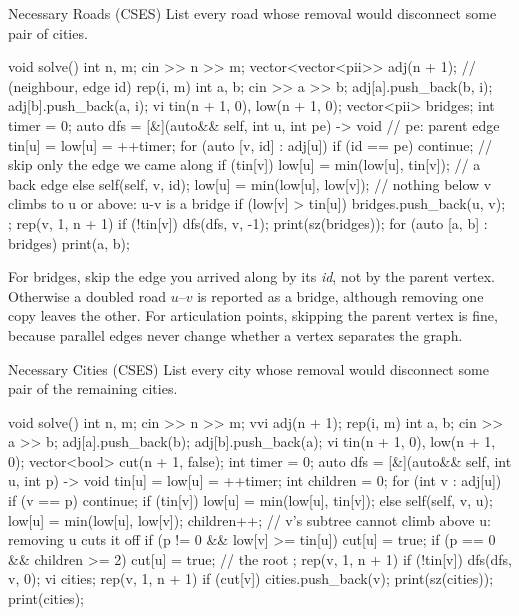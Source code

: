 \begin{problem}{Necessary Roads (CSES)}
List every road whose removal would disconnect some pair of cities.
\end{problem}

\begin{code}
void solve() {
    int n, m;
    cin >> n >> m;
    vector<vector<pii>> adj(n + 1);  // (neighbour, edge id)
    rep(i, m) {
        int a, b;
        cin >> a >> b;
        adj[a].push_back({b, i});
        adj[b].push_back({a, i});
    }
    vi tin(n + 1, 0), low(n + 1, 0);
    vector<pii> bridges;
    int timer = 0;
    auto dfs = [&](auto&& self, int u, int pe) -> void {  // pe: parent edge
        tin[u] = low[u] = ++timer;
        for (auto [v, id] : adj[u]) {
            if (id == pe) continue;  // skip only the edge we came along
            if (tin[v]) low[u] = min(low[u], tin[v]);  // a back edge
            else {
                self(self, v, id);
                low[u] = min(low[u], low[v]);
                // nothing below v climbs to u or above: u-v is a bridge
                if (low[v] > tin[u]) bridges.push_back({u, v});
            }
        }
    };
    rep(v, 1, n + 1) if (!tin[v]) dfs(dfs, v, -1);
    print(sz(bridges));
    for (auto [a, b] : bridges) print(a, b);
}
\end{code}

\begin{pitfall}
For bridges, skip the edge you arrived along by its \emph{id}, not by the parent vertex. Otherwise a doubled road $u$--$v$ is
reported as a bridge, although removing one copy leaves the other. For articulation points, skipping the parent vertex is fine,
because parallel edges never change whether a vertex separates the graph.
\end{pitfall}

\begin{problem}{Necessary Cities (CSES)}
List every city whose removal would disconnect some pair of the remaining cities.
\end{problem}

\begin{code}
void solve() {
    int n, m;
    cin >> n >> m;
    vvi adj(n + 1);
    rep(i, m) {
        int a, b;
        cin >> a >> b;
        adj[a].push_back(b);
        adj[b].push_back(a);
    }
    vi tin(n + 1, 0), low(n + 1, 0);
    vector<bool> cut(n + 1, false);
    int timer = 0;
    auto dfs = [&](auto&& self, int u, int p) -> void {
        tin[u] = low[u] = ++timer;
        int children = 0;
        for (int v : adj[u]) {
            if (v == p) continue;
            if (tin[v]) low[u] = min(low[u], tin[v]);
            else {
                self(self, v, u);
                low[u] = min(low[u], low[v]);
                children++;
                // v's subtree cannot climb above u: removing u cuts it off
                if (p != 0 && low[v] >= tin[u]) cut[u] = true;
            }
        }
        if (p == 0 && children >= 2) cut[u] = true;  // the root
    };
    rep(v, 1, n + 1) if (!tin[v]) dfs(dfs, v, 0);
    vi cities;
    rep(v, 1, n + 1) if (cut[v]) cities.push_back(v);
    print(sz(cities));
    print(cities);
}
\end{code}

